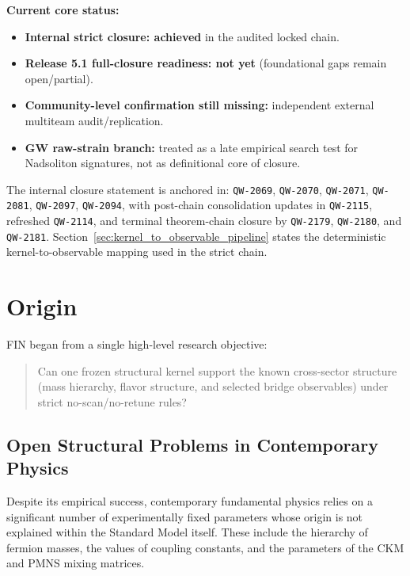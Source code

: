 \documentclass[11pt,a4paper]{article}
\newcommand{\QW}[1]{\texttt{QW-#1}}
\begin{document}
\textbf{Current core status:}
\begin{itemize}[leftmargin=1.4em]
    \item \textbf{Internal strict closure: achieved} in the audited locked chain.
    \item \textbf{Release 5.1 full-closure readiness: not yet} (foundational gaps remain open/partial).
    \item \textbf{Community-level confirmation still missing:} independent external multiteam audit/replication.
    \item \textbf{GW raw-strain branch:} treated as a late empirical search test for Nadsoliton signatures, not as definitional core of closure.
\end{itemize}

The internal closure statement is anchored in: \QW{2069}, \QW{2070}, \QW{2071}, \QW{2081}, \QW{2097}, \QW{2094}, with post-chain consolidation updates in \QW{2115}, refreshed \QW{2114}, and terminal theorem-chain closure by \QW{2179}, \QW{2180}, and \QW{2181}.
Section~\ref{sec:kernel_to_observable_pipeline} states the deterministic kernel-to-observable mapping used in the strict chain.

\tableofcontents
\newpage

\section{Origin}
FIN began from a single high-level research objective:
\begin{quote}
Can one frozen structural kernel support the known cross-sector structure (mass hierarchy, flavor structure, and selected bridge observables) under strict no-scan/no-retune rules?
\end{quote}

\subsection{Open Structural Problems in Contemporary Physics}
Despite its empirical success, contemporary fundamental physics relies on a significant number of experimentally fixed parameters whose origin is not explained within the Standard Model itself. These include the hierarchy of fermion masses, the values of coupling constants, and the parameters of the CKM and PMNS mixing matrices.
\end{document}
